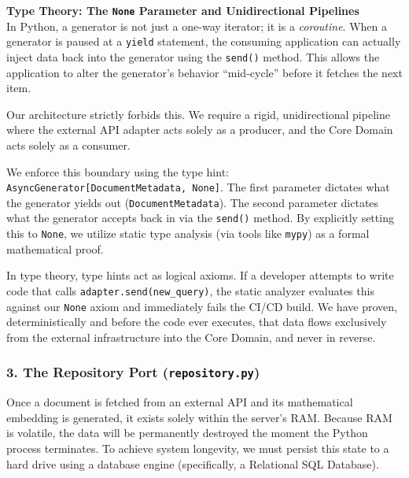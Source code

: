 \textbf{Type Theory: The \texttt{None} Parameter and Unidirectional Pipelines} \\
In Python, a generator is not just a one-way iterator; it is a \textit{coroutine}. When a generator is paused at a \texttt{yield} statement, the consuming application can actually inject data back into the generator using the \texttt{send()} method. This allows the application to alter the generator's behavior ``mid-cycle'' before it fetches the next item.

Our architecture strictly forbids this. We require a rigid, unidirectional pipeline where the external API adapter acts solely as a producer, and the Core Domain acts solely as a consumer.

We enforce this boundary using the type hint: \texttt{AsyncGenerator[\allowbreak{}DocumentMetadata, None]}. The first parameter dictates what the generator yields out (\texttt{DocumentMetadata}). The second parameter dictates what the generator accepts back in via the \texttt{send()} method. By explicitly setting this to \texttt{None}, we utilize static type analysis (via tools like \texttt{mypy}) as a formal mathematical proof.

In type theory, type hints act as logical axioms. If a developer attempts to write code that calls \texttt{adapter.send(new\_query)}, the static analyzer evaluates this against our \texttt{None} axiom and immediately fails the CI/CD build. We have proven, deterministically and before the code ever executes, that data flows exclusively from the external infrastructure into the Core Domain, and never in reverse.














\subsubsection*{3. The Repository Port (\texttt{repository.py})}

Once a document is fetched from an external API and its mathematical embedding is generated, it exists solely within the server's RAM. Because RAM is volatile, the data will be permanently destroyed the moment the Python process terminates. To achieve system longevity, we must persist this state to a hard drive using a database engine (specifically, a Relational SQL Database).

